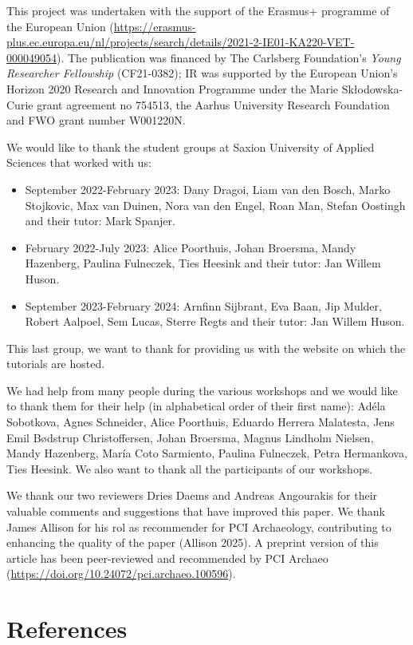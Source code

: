 \documentclass[
]{article}
\begin{document}
This project was undertaken with the support of the Erasmus+ programme of the European Union (\url{https://erasmus-plus.ec.europa.eu/nl/projects/search/details/2021-2-IE01-KA220-VET-000049054}). The publication was financed by The Carlsberg Foundation's \emph{Young Researcher Fellowship} (CF21-0382); IR was supported by the European Union's Horizon 2020 Research and Innovation Programme under the Marie Skłodowska-Curie grant agreement no 754513, the Aarhus University Research Foundation and FWO grant number W001220N.

We would like to thank the student groups at Saxion University of Applied Sciences that worked with us:

\begin{itemize}
\item
  September 2022-February 2023: Dany Dragoi, Liam van den Bosch, Marko Stojkovic, Max van Duinen, Nora van den Engel, Roan Man, Stefan Oostingh and their tutor: Mark Spanjer.
\item
  February 2022-July 2023: Alice Poorthuis, Johan Broersma, Mandy Hazenberg, Paulina Fulneczek, Ties Heesink and their tutor: Jan Willem Huson.
\item
  September 2023-February 2024: Arnfinn Sijbrant, Eva Baan, Jip Mulder, Robert Aalpoel, Sem Lucas, Sterre Regts and their tutor: Jan Willem Huson.
\end{itemize}

This last group, we want to thank for providing us with the website on which the tutorials are hosted.

We had help from many people during the various workshops and we would like to thank them for their help (in alphabetical order of their first name): Adéla Sobotkova, Agnes Schneider, Alice Poorthuis, Eduardo Herrera Malatesta, Jens Emil Bødstrup Christoffersen, Johan Broersma, Magnus Lindholm Nielsen, Mandy Hazenberg, María Coto Sarmiento, Paulina Fulneczek, Petra Hermankova, Ties Heesink. We also want to thank all the participants of our workshops.

We thank our two reviewers Dries Daems and Andreas Angourakis for their valuable comments and suggestions that have improved this paper. We thank James Allison for his rol as recommender for PCI Archaeology, contributing to enhancing the quality of the paper (Allison 2025). A preprint version of this article has been peer-reviewed and recommended by PCI Archaeo (\url{https://doi.org/10.24072/pci.archaeo.100596}).

\hypertarget{references}{%
\section*{References}\label{references}}
\end{document}
